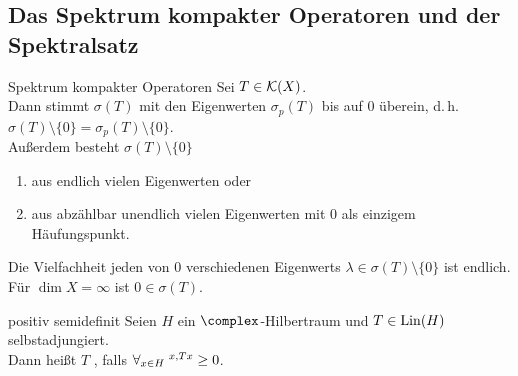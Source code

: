 \pagebreak

\subsection{%
    Das Spektrum kompakter Operatoren und der Spektralsatz%
}

\begin{Satz}{Spektrum kompakter Operatoren}
    Sei $T \in \mathcal{K}(X)$.\\
    Dann stimmt $\sigma(T)$ mit den Eigenwerten $\sigma_p(T)$ bis auf $0$ überein,
    d.\,h. $\sigma(T) \setminus \{0\} = \sigma_p(T) \setminus \{0\}$.\\
    Außerdem besteht $\sigma(T) \setminus \{0\}$
    \begin{enumerate}
        \item
        aus endlich vielen Eigenwerten oder
        
        \item
        aus abzählbar unendlich vielen Eigenwerten mit $0$ als einzigem Häufungspunkt.
    \end{enumerate}
    Die Vielfachheit jeden von $0$ verschiedenen Eigenwerts
    $\lambda \in \sigma(T) \setminus \{0\}$ ist endlich.\\
    Für $\dim X = \infty$ ist $0 \in \sigma(T)$.
\end{Satz}

\linie

\begin{Def}{positiv semidefinit}
    Seien $H$ ein $\complex$-Hilbertraum und $T \in \operatorname{Lin}(H)$ selbstadjungiert.\\
    Dann heißt $T$ , falls
    $\forall_{x \in H}\; \sp{x, Tx} \ge 0$.
\end{Def}

